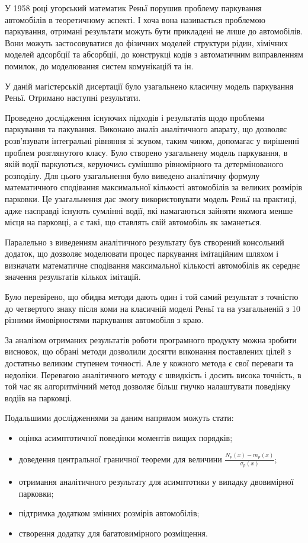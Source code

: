
У 1958 році угорський математик Реньї порушив проблему паркування автомобілів в теоретичному аспекті. І хоча вона називається проблемою паркування, отримані результати можуть бути прикладені не лише до автомобілів. Вони можуть застосовуватися до фізичних моделей структури рідин, хімічних моделей адсорбції та абсорбції, до конструкці кодів з автоматичним виправленням помилок, до моделювання систем комунікацій та ін.

У даній магістерській дисертації було узагальнено класичну модель паркування Реньї. Отримано наступні результати.

Проведено дослідження існуючих підходів і результатів щодо проблеми паркування та пакування. Виконано аналіз аналітичного апарату, що дозволяє розв'язувати інтегральні рівняння зі зсувом, таким чином, допомагає у вирішенні проблем розглянутого класу. Було створено узагальнену модель паркування, в якій водії паркуються, керуючись сумішшю рівномірного та детермінованого розподілу. Для цього узагальнення було виведено аналітичну формулу математичного сподівання максимальної кількості автомобілів за великих розмірів парковки. Це узагальнення дає змогу використовувати модель Реньї на практиці, адже насправді існують сумлінні водії, які намагаються зайняти якомога менше місця на парковці, а є такі, що ставлять свій автомобіль як заманеться.

Паралельно з виведенням аналітичного результату був створений консольний додаток, що дозволяє моделювати процес паркування імітаційним шляхом і визначати математичне сподівання максимальної кількості автомобілів як середнє значення результатів кількох імітацій.

Було перевірено, що обидва методи дають один і той самий результат з точністю до четвертого знаку після коми на класичній моделі Реньї та на узагальненій з 10 різними ймовірностями паркування автомобіля з краю.

За аналізом отриманих результатів роботи програмного продукту можна зробити висновок, що обрані методи дозволили досягти виконання поставлених цілей з достатньо великим ступенем точності. Але у кожного метода є свої переваги та недоліки. Перевагою аналітичного методу є швидкість і досить висока точність, в той час як алгоритмічний метод дозволяє більш гнучко налаштувати поведінку водіїв на парковці.

Подальшими дослідженнями за даним напрямом можуть стати:
\begin{itemize}
\item оцінка асимптотичної поведінки моментів вищих порядків;
\item доведення центральної граничної теореми для величини $\frac{N_{p}(x) - m_{p}(x)}{\sigma_{p}(x)}$;
\item отримання аналітичного результату для асимптотики у випадку двовимірної парковки;
\item підтримка додатком змінних розмірів автомобілів;
\item створення додатку для багатовимірного розміщення.
\end{itemize}

